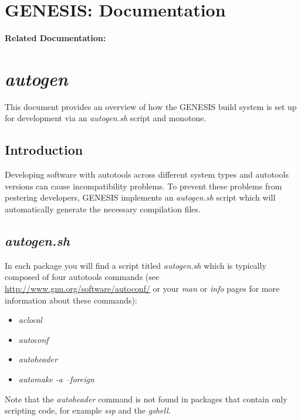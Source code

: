\documentclass[12pt]{article}
\begin{document}
\section*{GENESIS: Documentation}

{\bf Related Documentation:}

\section*{\it autogen}

This document provides an overview of how the GENESIS build system is set up for development via an {\it autogen.sh} script and monotone.

\subsection*{Introduction}

Developing software with autotools across different system types and autotools versions can cause incompatibility problems. To prevent these problems from pestering developers, GENESIS implements an {\it autogen.sh} script which will automatically generate the necessary compilation files.

\subsection*{\it autogen.sh}

In each package you will find a script titled {\it autogen.sh} which is typically composed of four autotools commands (see \href{http://www.gnu.org/software/autoconf/}{http://www.gnu.org/software/autoconf/} or your {\it man} or {\it info} pages for more information about these commands):
\begin{itemize}
	\item {\it aclocal}
	\item {\it autoconf}
	\item {\it autoheader}
	\item {\it automake -a --foreign}
\end{itemize}
Note that the {\it autoheader} command is not found in packages that contain only scripting code, for example {\it ssp} and the {\it gshell}.
\end{document}
